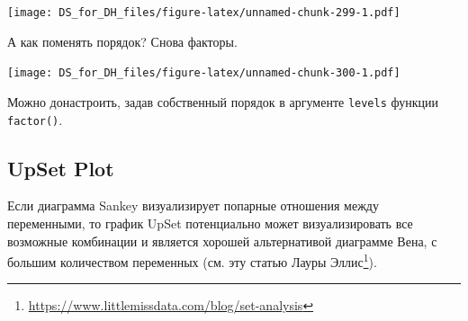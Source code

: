 \documentclass[
]{book}
\newenvironment{Shaded}{\begin{snugshade}}{\end{snugshade}}
\newcommand{\DataTypeTok}[1]{\textcolor[rgb]{0.13,0.29,0.53}{#1}}
\newcommand{\DecValTok}[1]{\textcolor[rgb]{0.00,0.00,0.81}{#1}}
\newcommand{\FloatTok}[1]{\textcolor[rgb]{0.00,0.00,0.81}{#1}}
\newcommand{\KeywordTok}[1]{\textcolor[rgb]{0.13,0.29,0.53}{\textbf{#1}}}
\newcommand{\NormalTok}[1]{#1}
\newcommand{\OperatorTok}[1]{\textcolor[rgb]{0.81,0.36,0.00}{\textbf{#1}}}
\newcommand{\StringTok}[1]{\textcolor[rgb]{0.31,0.60,0.02}{#1}}
\renewcommand{\href}[2]{#2\footnote{\url{#1}}}
\begin{document}
\texttt{[image: DS\_for\_DH\_files/figure-latex/unnamed-chunk-299-1.pdf]}

А как поменять порядок? Снова факторы.

\begin{Shaded}
\end{Shaded}

\texttt{[image: DS\_for\_DH\_files/figure-latex/unnamed-chunk-300-1.pdf]}

Можно донастроить, задав собственный порядок в аргументе \texttt{levels} функции \texttt{factor()}.

\hypertarget{upset-plot}{%
\subsection{UpSet Plot}\label{upset-plot}}

Если диаграмма Sankey визуализирует попарные отношения между переменными, то график UpSet потенциально может визуализировать все возможные комбинации и является хорошей альтернативой диаграмме Вена, с большим количеством переменных (см. \href{https://www.littlemissdata.com/blog/set-analysis}{эту статью Лауры Эллис}).
\end{document}
